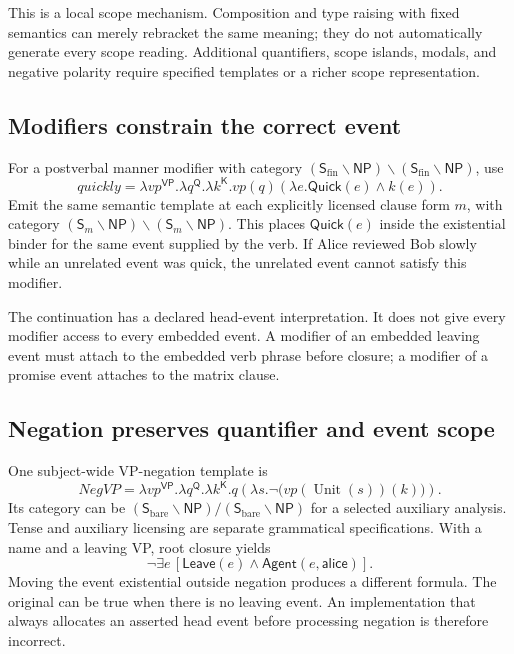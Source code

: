 \documentclass[11pt,a4paper]{article}
\newcommand{\Q}{\mathsf{Q}}
\newcommand{\KK}{\mathsf{K}}
\newcommand{\VP}{\mathsf{VP}}
\newcommand{\NP}{\mathsf{NP}}
\newcommand{\SF}{\mathsf{S}_{\mathrm{fin}}}
\newcommand{\SB}{\mathsf{S}_{\mathrm{bare}}}
\newcommand{\Unit}{\operatorname{Unit}}
\begin{document}
This is a local scope mechanism. Composition and type raising with fixed
semantics can merely rebracket the same meaning; they do not automatically
generate every scope reading. Additional quantifiers, scope islands, modals,
and negative polarity require specified templates or a richer scope
representation.

\subsection{Modifiers constrain the correct event}
For a postverbal manner modifier with category
\((\SF\backslash\NP)\backslash(\SF\backslash\NP)\), use
\begin{equation}
 \mathit{quickly}
 =\lambda vp^{\VP}.\lambda q^{\Q}.\lambda k^{\KK}.
       vp(q)(\lambda e.\mathsf{Quick}(e)\land k(e)).
 \label{eq:quick}
\end{equation}
Emit the same semantic template at each explicitly licensed clause form
\(m\), with category
\((\mathsf S_m\backslash\NP)\backslash(\mathsf S_m\backslash\NP)\).
This places \(\mathsf{Quick}(e)\) inside the existential binder for the same
event supplied by the verb. If Alice reviewed Bob slowly while an unrelated
event was quick, the unrelated event cannot satisfy this modifier.

The continuation has a declared head-event interpretation. It does not give
every modifier access to every embedded event. A modifier of an embedded
leaving event must attach to the embedded verb phrase before closure; a
modifier of a promise event attaches to the matrix clause.

\subsection{Negation preserves quantifier and event scope}
One subject-wide VP-negation template is
\begin{equation}
 \mathit{NegVP}
 =\lambda vp^{\VP}.\lambda q^{\Q}.\lambda k^{\KK}.
     q\!\left(\lambda s.\neg\bigl(vp(\Unit(s))(k)\bigr)\right).
 \label{eq:negvp}
\end{equation}
Its category can be
\((\SB\backslash\NP)/(\SB\backslash\NP)\) for a selected auxiliary analysis.
Tense and auxiliary licensing are separate grammatical specifications.
With a name and a leaving VP, root closure yields
\[
 \neg\exists e\,
   [\mathsf{Leave}(e)\land\mathsf{Agent}(e,\mathsf{alice})].
\]
Moving the event existential outside negation produces a different formula.
The original can be true when there is no leaving event. An implementation
that always allocates an asserted head event before processing negation is
therefore incorrect.
\end{document}
